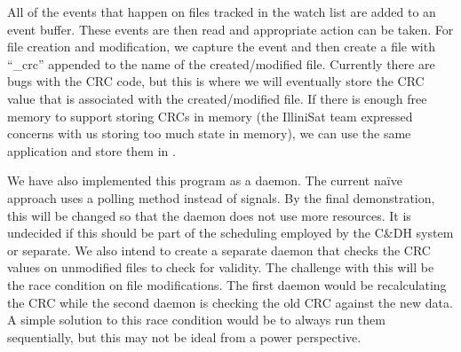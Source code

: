 All of the events that happen on files tracked in the watch list are added to an
 event buffer.  These events are then read and appropriate action
can be taken. For file creation and modification, we capture the event and then
create a file with ``\_crc'' appended to the name of the created/modified file.
Currently there are bugs with the CRC code, but this is where we will eventually
store the CRC value that is associated with the created/modified file.  If there
is enough free memory to support storing CRCs in memory (the IlliniSat team
expressed concerns with us storing too much state in memory), we can use the
same application and store them in .

We have also implemented this program as a daemon. The current na\"ive approach 
uses a polling method instead of signals.  By the final demonstration, this
will be changed so that the daemon does not use more resources.  It is undecided
if this should be part of the  scheduling employed by the C\&DH system
or separate.  We also intend to create a separate daemon that checks the CRC 
values on unmodified files to check for validity.  The challenge with this will
be the race condition on file modifications.  The first daemon would be
recalculating the CRC while the second daemon is checking the old CRC against
the new data.  A simple solution to this race condition would be to always run
them sequentially, but this may not be ideal from a power perspective.
